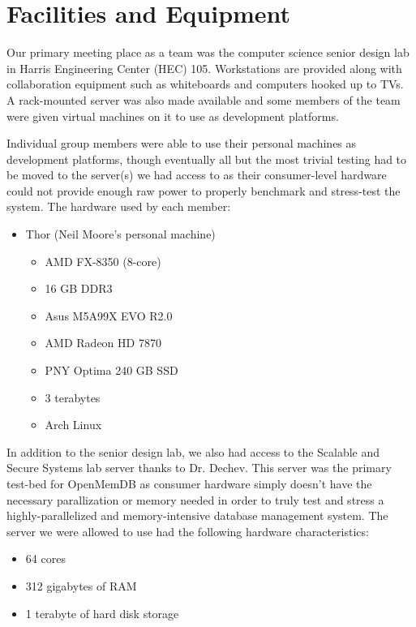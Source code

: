 \documentclass[letterpaper, 12pt]{article}
\begin{document}
\section{Facilities and Equipment}
Our primary meeting place as a team was the computer science senior design lab in Harris Engineering
Center (HEC) 105. Workstations are provided along with collaboration equipment such as 
whiteboards and computers hooked up to TVs. A rack-mounted server was also made available and 
some members of the team were given virtual machines on it to use as development
platforms.
\par\vspace{\baselineskip}
Individual group members were able to use their personal machines as development platforms, though 
eventually all but the most trivial testing had to be moved to the server(s) we had access to
as their consumer-level hardware could not provide enough raw power to properly benchmark and
stress-test the system. The hardware used by each member:
\begin{itemize}
 \item Thor (Neil Moore's personal machine)
 \begin{itemize}
  \item{ AMD FX-8350 (8-core)}
  \item{ 16 GB DDR3}
  \item{ Asus M5A99X EVO R2.0}
  \item{ AMD Radeon HD 7870}
  \item{ PNY Optima 240 GB SSD}
  \item{ 3 terabytes}
  \item{ Arch Linux}
 \end{itemize}
\end{itemize}
\par\vspace{\baselineskip}
In addition to the senior design lab, we also had access to the Scalable and Secure Systems lab server
thanks to Dr. Dechev. This server was the primary test-bed for OpenMemDB as consumer hardware simply
doesn't have the necessary parallization or memory needed in order to truly test and stress a
highly-parallelized and memory-intensive database management system. The server we were allowed to 
use had the following hardware characteristics:
\begin{itemize}
 \item 64 cores
 \item 312 gigabytes of RAM
 \item 1 terabyte of hard disk storage
\end{itemize}
\end{document}
